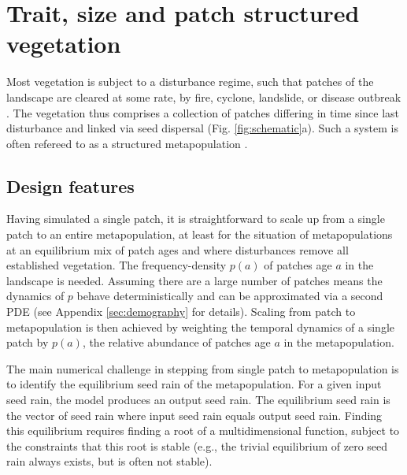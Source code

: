 \documentclass[]{article}
\begin{document}
\section{Trait, size and patch structured
vegetation}\label{trait-size-and-patch-structured-vegetation}

Most vegetation is subject to a disturbance regime, such that patches of
the landscape are cleared at some rate, by fire, cyclone, landslide, or
disease outbreak
\citep{Connell-1978, White-1979, Chambers-2013, Bormann-1979, Clark-1991, Coomes-2007}.
The vegetation thus comprises a collection of patches differing in time
since last disturbance and linked via seed dispersal (Fig.
\ref{fig:schematic}a). Such a system is often refereed to as a
structured metapopulation \citep{Gyllenberg-2001}.

\subsection{Design features}\label{design-features-2}

Having simulated a single patch, it is straightforward to scale up from
a single patch to an entire metapopulation, at least for the situation
of metapopulations at an equilibrium mix of patch ages and where
disturbances remove all established vegetation. The frequency-density
\(p(a)\) of patches age \(a\) in the landscape is needed. Assuming there
are a large number of patches means the dynamics of \(p\) behave
deterministically and can be approximated via a second PDE
\citep{Vonfoerster-1959, Mckendrick-1926} (see Appendix
\ref{sec:demography} for
details). Scaling from patch to metapopulation is then achieved by
weighting the temporal dynamics of a single patch by \(p(a)\), the
relative abundance of patches age \(a\) in the metapopulation.

 The main numerical challenge in stepping from single patch
to metapopulation is to identify the equilibrium seed rain of the
metapopulation. For a given input seed rain, the model produces an
output seed rain. The equilibrium seed rain is the vector of seed rain
where input seed rain equals output seed rain. Finding this equilibrium
requires finding a root of a multidimensional function, subject to the
constraints that this root is stable (e.g., the trivial equilibrium of
zero seed rain always exists, but is often not stable).
\end{document}

